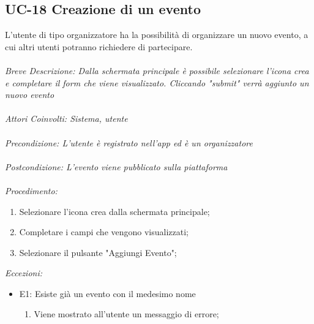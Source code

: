 \subsection{UC-18 Creazione di un evento}
L'utente di tipo organizzatore ha la possibilità di organizzare un nuovo evento, a cui altri utenti potranno richiedere di partecipare.
\\
\\
\textit{Breve Descrizione: Dalla schermata principale è possibile selezionare l'icona crea e completare il form che viene visualizzato. Cliccando "submit" verrà aggiunto un nuovo evento} 
\\
\\
\textit{Attori Coinvolti: Sistema, utente}
\\
\\
\textit{Precondizione: L'utente è registrato nell'app ed è un organizzatore}
\\
\\
\textit{Postcondizione: L'evento viene pubblicato sulla piattaforma}
\\
\\
\textit{Procedimento:}
\begin{enumerate}
	\item Selezionare l'icona crea dalla schermata principale;
	\item Completare i campi che vengono visualizzati;
	\item Selezionare il pulsante "Aggiungi Evento";
\end{enumerate}


\textit{Eccezioni:}
\begin{itemize}
	\item E1: Esiste già un evento con il medesimo nome
	\begin{enumerate}
		\item Viene mostrato all'utente un messaggio di errore;
	\end{enumerate}
\end{itemize}